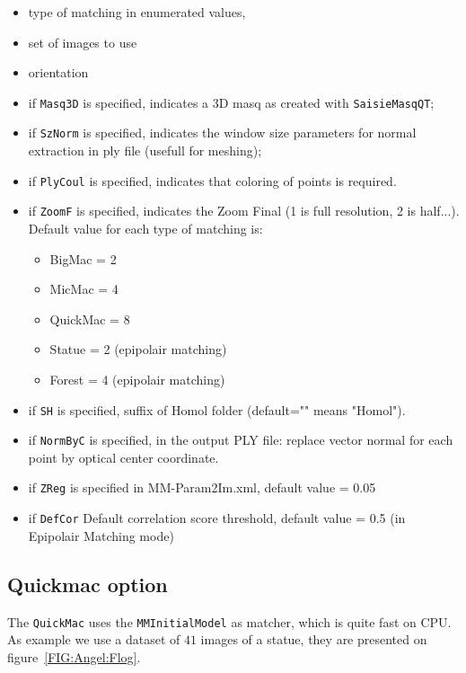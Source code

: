 \begin{itemize}
  \item type of matching in enumerated values,

  \item set of images to use

  \item orientation

  \item if {\tt Masq3D} is specified, indicates a 3D masq as created with {\tt SaisieMasqQT};
  \item if {\tt SzNorm} is specified, indicates the window size parameters for normal extraction in ply file
	(usefull for meshing);
  \item if {\tt PlyCoul} is specified, indicates that coloring of points is required.
  \item if {\tt ZoomF} is specified, indicates the Zoom Final (1 is full resolution, 2 is half...). Default value for each type of matching is:
	\begin{itemize}
		\item BigMac = 2
       		\item MicMac = 4
       		\item QuickMac = 8
       		\item Statue = 2 (epipolair matching)
       		\item Forest = 4 (epipolair matching)
	\end{itemize}
  \item if {\tt SH} is specified, suffix of Homol folder (default="" means "Homol").
  \item if {\tt NormByC} is specified, in the output PLY file: replace vector normal for each point by optical center coordinate.
  \item if {\tt ZReg} is specified in MM-Param2Im.xml, default value = 0.05
  \item if {\tt DefCor} Default correlation score threshold, default value = 0.5 (in Epipolair Matching mode)
\end{itemize}

\subsection{Quickmac option}

The {\tt QuickMac} uses the {\tt MMInitialModel} as matcher, which is quite fast on CPU.
As example we use a dataset of $41$ images of a statue, they are presented on figure~\ref{FIG:Angel:Flog}.


